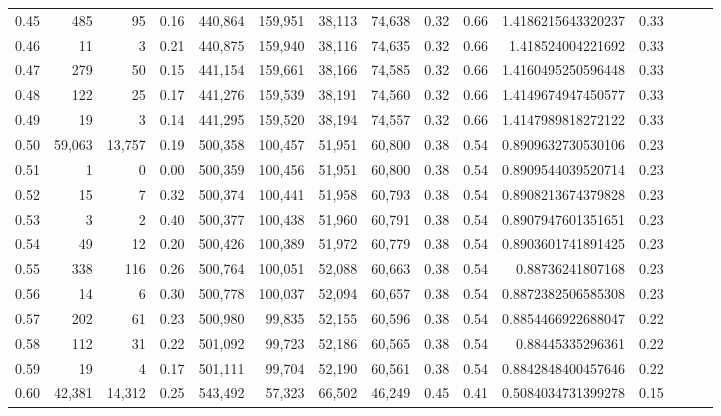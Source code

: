 \begin{tabular}{rrrrrrrrrrrrrrr}
0.45 &     485 &      95 &  0.16 &  440,864 &  159,951 &   38,113 &   74,638 &  0.32 &  0.66 &    1.4186215643320237 &      0.33 \\
0.46 &      11 &       3 &  0.21 &  440,875 &  159,940 &   38,116 &   74,635 &  0.32 &  0.66 &     1.418524004221692 &      0.33 \\
0.47 &     279 &      50 &  0.15 &  441,154 &  159,661 &   38,166 &   74,585 &  0.32 &  0.66 &    1.4160495250596448 &      0.33 \\
0.48 &     122 &      25 &  0.17 &  441,276 &  159,539 &   38,191 &   74,560 &  0.32 &  0.66 &    1.4149674947450577 &      0.33 \\
0.49 &      19 &       3 &  0.14 &  441,295 &  159,520 &   38,194 &   74,557 &  0.32 &  0.66 &    1.4147989818272122 &      0.33 \\
0.50 &  59,063 &  13,757 &  0.19 &  500,358 &  100,457 &   51,951 &   60,800 &  0.38 &  0.54 &    0.8909632730530106 &      0.23 \\
0.51 &       1 &       0 &  0.00 &  500,359 &  100,456 &   51,951 &   60,800 &  0.38 &  0.54 &    0.8909544039520714 &      0.23 \\
0.52 &      15 &       7 &  0.32 &  500,374 &  100,441 &   51,958 &   60,793 &  0.38 &  0.54 &    0.8908213674379828 &      0.23 \\
0.53 &       3 &       2 &  0.40 &  500,377 &  100,438 &   51,960 &   60,791 &  0.38 &  0.54 &    0.8907947601351651 &      0.23 \\
0.54 &      49 &      12 &  0.20 &  500,426 &  100,389 &   51,972 &   60,779 &  0.38 &  0.54 &    0.8903601741891425 &      0.23 \\
0.55 &     338 &     116 &  0.26 &  500,764 &  100,051 &   52,088 &   60,663 &  0.38 &  0.54 &      0.88736241807168 &      0.23 \\
0.56 &      14 &       6 &  0.30 &  500,778 &  100,037 &   52,094 &   60,657 &  0.38 &  0.54 &    0.8872382506585308 &      0.23 \\
0.57 &     202 &      61 &  0.23 &  500,980 &   99,835 &   52,155 &   60,596 &  0.38 &  0.54 &    0.8854466922688047 &      0.22 \\
0.58 &     112 &      31 &  0.22 &  501,092 &   99,723 &   52,186 &   60,565 &  0.38 &  0.54 &      0.88445335296361 &      0.22 \\
0.59 &      19 &       4 &  0.17 &  501,111 &   99,704 &   52,190 &   60,561 &  0.38 &  0.54 &    0.8842848400457646 &      0.22 \\
0.60 &  42,381 &  14,312 &  0.25 &  543,492 &   57,323 &   66,502 &   46,249 &  0.45 &  0.41 &    0.5084034731399278 &      0.15 \\

\end{tabular}

